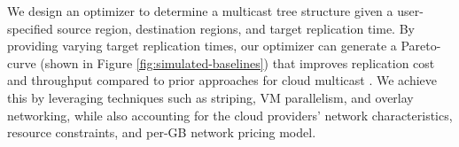 We design an optimizer to determine a multicast tree structure given a user-specified source region, destination regions, and target replication time.
By providing varying target replication times, our optimizer can generate a Pareto-curve (shown in Figure \ref{fig:simulated-baselines}) that improves replication cost and throughput compared to prior approaches for cloud multicast \cite{garcia2015cost, ganguly2005fast}. We achieve this by leveraging techniques such as striping, VM parallelism, and overlay networking, while also accounting for the cloud providers' network characteristics, resource constraints, and per-GB network pricing model.







